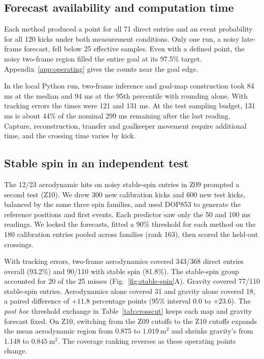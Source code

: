 \subsection{Forecast availability and computation time}
Each method produced a point for all 71 direct entries and an event probability for all 120 kicks under both measurement conditions. Only one run, a noisy late-frame forecast, fell below 25 effective samples. Even with a defined point, the noisy two-frame region filled the entire goal at its 97.5\% target. Appendix~\ref{app:operating} gives the counts near the goal edge.

In the local Python run, two-frame inference and goal-map construction took 84 ms at the median and 94 ms at the 95th percentile with rounding alone. With tracking errors the times were 121 and 131 ms. At the test sampling budget, 131 ms is about 44\% of the nominal 299 ms remaining after the last reading. Capture, reconstruction, transfer and goalkeeper movement require additional time, and the crossing time varies by kick.

\subsection{Stable spin in an independent test}
\label{sec:stable-spin}
The 12/23 aerodynamic hits on noisy stable-spin entries in Z09 prompted a second test (Z10). We drew 300 new calibration kicks and 600 new test kicks, balanced by the same three spin families, and used DOP853 to generate the reference positions and first events. Each predictor saw only the 50 and 100 ms readings. We locked the forecasts, fitted a 90\% threshold for each method on the 180 calibration entries pooled across families (rank 163), then scored the held-out crossings.

With tracking errors, two-frame aerodynamics covered 343/368 direct entries overall (93.2\%) and 90/110 with stable spin (81.8\%). The stable-spin group accounted for 20 of the 25 misses (Fig.~\ref{fig:stable-spin}A). Gravity covered 77/110 stable-spin entries. Aerodynamics alone covered 31 and gravity alone covered 18, a paired difference of \(+11.8\) percentage points (95\% interval 0.0 to \(+23.6\)). The \emph{post hoc} threshold exchange in Table~\ref{tab:crosscut} keeps each map and gravity forecast fixed. On Z10, switching from the Z09 cutoffs to the Z10 cutoffs expands the mean aerodynamic region from 0.875 to \(1.019\ \mathrm{m^2}\) and shrinks gravity's from 1.148 to \(0.845\ \mathrm{m^2}\). The coverage ranking reverses as these operating points change.

